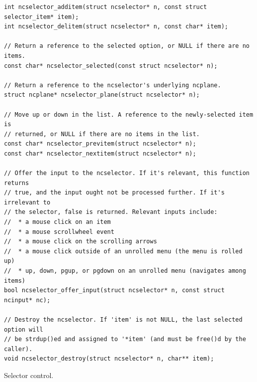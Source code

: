 \documentclass[letterpaper,10pt]{article}
\begin{document}
\begin{listing}[!htb]
\begin{verbatim}
int ncselector_additem(struct ncselector* n, const struct selector_item* item);
int ncselector_delitem(struct ncselector* n, const char* item);

// Return a reference to the selected option, or NULL if there are no items.
const char* ncselector_selected(const struct ncselector* n);

// Return a reference to the ncselector's underlying ncplane.
struct ncplane* ncselector_plane(struct ncselector* n);

// Move up or down in the list. A reference to the newly-selected item is
// returned, or NULL if there are no items in the list.
const char* ncselector_previtem(struct ncselector* n);
const char* ncselector_nextitem(struct ncselector* n);

// Offer the input to the ncselector. If it's relevant, this function returns
// true, and the input ought not be processed further. If it's irrelevant to
// the selector, false is returned. Relevant inputs include:
//  * a mouse click on an item
//  * a mouse scrollwheel event
//  * a mouse click on the scrolling arrows
//  * a mouse click outside of an unrolled menu (the menu is rolled up)
//  * up, down, pgup, or pgdown on an unrolled menu (navigates among items)
bool ncselector_offer_input(struct ncselector* n, const struct ncinput* nc);

// Destroy the ncselector. If 'item' is not NULL, the last selected option will
// be strdup()ed and assigned to '*item' (and must be free()d by the caller).
void ncselector_destroy(struct ncselector* n, char** item);
\end{verbatim}
\caption{Selector control.}
\end{listing}
\end{document}
